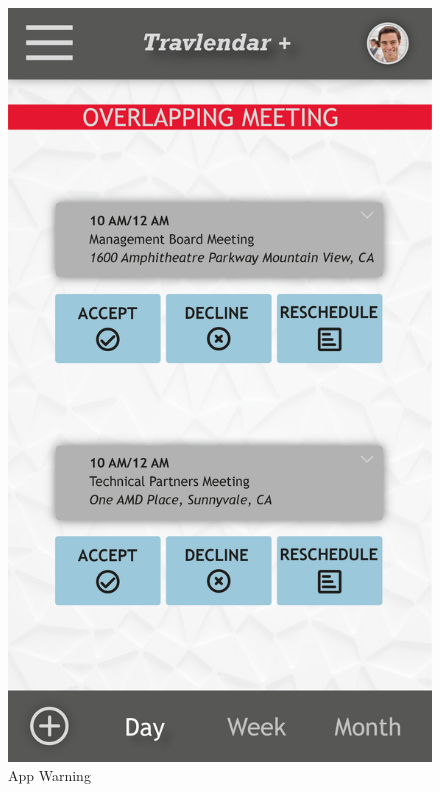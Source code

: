 \vspace*{-0.2cm}
\begin{figure}[!h]
	\centering
	\begin{minipage}{.275\textwidth}
		\centering
		\includegraphics[width=\linewidth]{Images/Mockups/MockupWarningApp.png}
		\caption{App Warning}
	\end{minipage}%
	\hspace*{1cm}
	\begin{minipage}{.65\textwidth}
		\centering

\end{minipage}
\end{figure}
